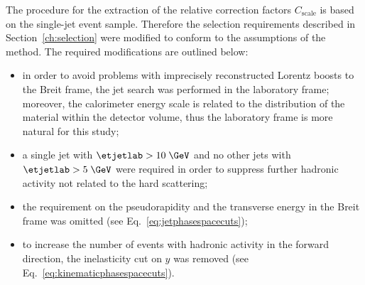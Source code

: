 The procedure for the extraction of the relative correction factors $C_\text{scale}$ is based on the single-jet event sample. Therefore the selection requirements described in Section~\ref{ch:selection} were modified to conform to the assumptions of the method. The required modifications are outlined below: 
\begin{itemize}
	\item in order to avoid problems with imprecisely reconstructed Lorentz boosts to the Breit frame, the jet search was performed in the laboratory frame; moreover, the calorimeter energy scale is related to the distribution of the material within the detector volume, thus the laboratory frame is more natural for this study;
	\item a single jet with $\etjetlab > 10\; \GeV$ and no other jets with $\etjetlab > 5\; \GeV$ were required in order to suppress further hadronic activity not related to the hard scattering;
	\item the requirement on the pseudorapidity and the transverse energy in the Breit frame was omitted (see Eq.~\eqref{eq:jetphasespacecuts});
	\item to increase the number of events with hadronic activity in the forward direction, the inelasticity cut on $y$ was removed  (see Eq.~\eqref{eq:kinematicphasespacecuts}).
\end{itemize}

